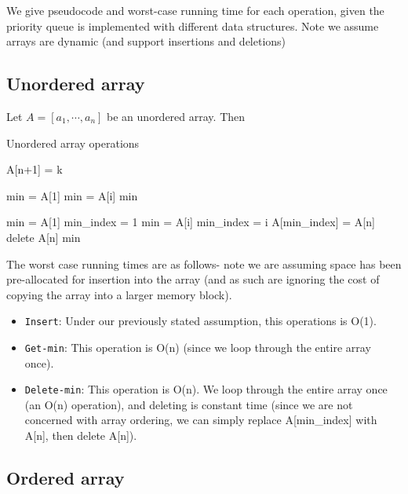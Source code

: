 \documentclass[paper=a4, fontsize=11pt]{scrartcl} %
\numberwithin{equation}{section} %
\numberwithin{figure}{section} %
\numberwithin{table}{section} %
\begin{document}
 We give pseudocode and worst-case running time for each operation, given the priority queue is implemented with different data structures. Note we assume arrays are dynamic (and support insertions and deletions)

 \subsection{Unordered array}
Let $A = [a_1, \cdots, a_n]$ be an unordered array. Then

\begin{algorithm}\small
\caption{Unordered array operations}
\begin{algorithmic}
	\State A[n+1] = k
\EndFunction

	\State min = A[1]
			\State min = A[i]
		\EndIf
	\EndFor
	\State \Return min
\EndFunction

	\State min = A[1]
	\State min\_index = 1
			\State min = A[i]
			\State min\_index = i
		\EndIf
	\EndFor
	\State A[min\_index] = A[n]
	\State delete A[n]
	\State \Return min
\EndFunction

\end{algorithmic}
\end{algorithm}

The worst case running times are as follows- note we are assuming space has been pre-allocated for insertion into the array (and as such are ignoring the cost of copying the array into a larger memory block).

\begin{itemize}
\item \texttt{Insert}: Under our previously stated assumption, this operations is O(1).
\item \texttt{Get-min}: This operation is O(n) (since we loop through the entire array once).
\item \texttt{Delete-min}: This operation is O(n). We loop through the entire array once (an O(n) operation), and deleting is constant time (since we are not concerned with array ordering, we can simply replace A[min\_index] with A[n], then delete A[n]).
\end{itemize}

\subsection{Ordered array}
\end{document}
